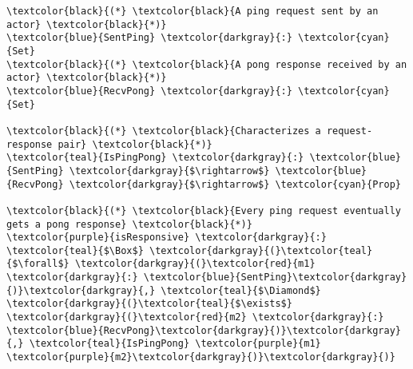 \begin{Verbatim}[commandchars=\\\{\},codes={\catcode`$=3}]
\textcolor{black}{(*} \textcolor{black}{A ping request sent by an actor} \textcolor{black}{*)}
\textcolor{blue}{SentPing} \textcolor{darkgray}{:} \textcolor{cyan}{Set}
\textcolor{black}{(*} \textcolor{black}{A pong response received by an actor} \textcolor{black}{*)}
\textcolor{blue}{RecvPong} \textcolor{darkgray}{:} \textcolor{cyan}{Set}

\textcolor{black}{(*} \textcolor{black}{Characterizes a request-response pair} \textcolor{black}{*)}
\textcolor{teal}{IsPingPong} \textcolor{darkgray}{:} \textcolor{blue}{SentPing} \textcolor{darkgray}{$\rightarrow$} \textcolor{blue}{RecvPong} \textcolor{darkgray}{$\rightarrow$} \textcolor{cyan}{Prop}

\textcolor{black}{(*} \textcolor{black}{Every ping request eventually gets a pong response} \textcolor{black}{*)}
\textcolor{purple}{isResponsive} \textcolor{darkgray}{:} \textcolor{teal}{$\Box$} \textcolor{darkgray}{(}\textcolor{teal}{$\forall$} \textcolor{darkgray}{(}\textcolor{red}{m1} \textcolor{darkgray}{:} \textcolor{blue}{SentPing}\textcolor{darkgray}{)}\textcolor{darkgray}{,} \textcolor{teal}{$\Diamond$} \textcolor{darkgray}{(}\textcolor{teal}{$\exists$} \textcolor{darkgray}{(}\textcolor{red}{m2} \textcolor{darkgray}{:} \textcolor{blue}{RecvPong}\textcolor{darkgray}{)}\textcolor{darkgray}{,} \textcolor{teal}{IsPingPong} \textcolor{purple}{m1} \textcolor{purple}{m2}\textcolor{darkgray}{)}\textcolor{darkgray}{)}
\end{Verbatim}
